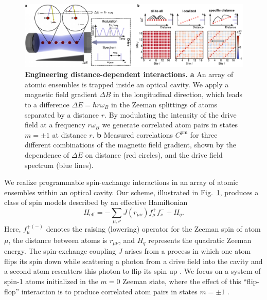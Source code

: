 \documentclass[aps,pra,twocolumn,superscriptaddress]{revtex4-1} %
\begin{document}
\begin{bibunit}
\begin{figure}
\includegraphics[width=\textwidth]{Figures/Figure1.pdf}
\caption{\textbf{Engineering distance-dependent interactions.} 
\textbf{a} An array of atomic ensembles is trapped inside an optical cavity. We apply a magnetic field gradient $\Delta B$ in the longitudinal direction, which leads to a difference $\Delta E = \hbar r\omega_B$ in the Zeeman splittings of atoms separated by a distance $r$. By modulating the intensity of the drive field at a frequency $r\omega_{B}$ we generate correlated atom pairs in states $m = \pm1$ at distance $r$.
\textbf{b} Measured correlations $C^\text{pm}$ for three different combinations of the magnetic field gradient, shown by the dependence of $\Delta E$ on distance (red circles), and the drive field spectrum (blue lines).
}
\label{fig:overview}
\end{figure}

We realize programmable spin-exchange interactions in an array of atomic ensembles within an optical cavity.  Our scheme, illustrated in Fig.~\ref{fig:overview}, produces a class of spin models described by an effective Hamiltonian
\begin{equation}
H_{\text{eff}} = -\sum_{\mu,\nu} J(r_{\mu\nu}) f^+_\mu f^-_\nu + H_q. %
\label{eq:Heff}
\end{equation} Here, $f^{+(-)}_\mu$ denotes the raising (lowering) operator for the Zeeman spin of atom $\mu$, the distance between atoms is $r_{\mu\nu}$, and $H_q$ represents the quadratic Zeeman energy.  The spin-exchange coupling $J$ arises from a process in which one atom flips its spin down while scattering a photon from a drive field into the cavity and a second atom rescatters this photon to flip its spin up \cite{davis2019photon,davis2020protecting}. We focus on a system of spin-1 atoms initialized in the $m=0$ Zeeman state, where the effect of this ``flip-flop'' interaction is to produce correlated atom pairs in states $m=\pm 1$ \cite{masson2017cavity,davis2019photon,hamley2012spin}.


\end{bibunit}
\end{document}
